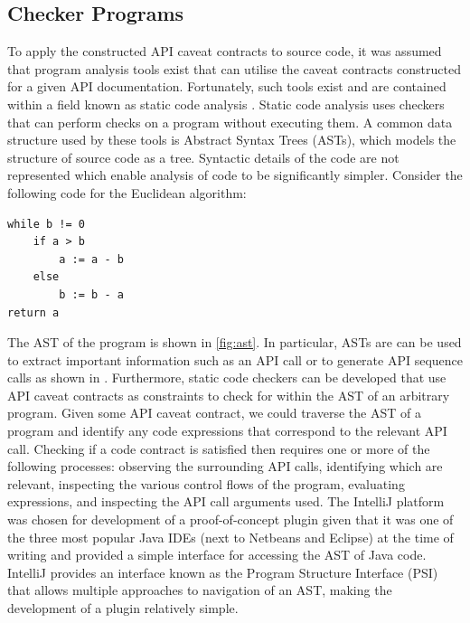 \subsection{Checker Programs}
To apply the constructed API caveat contracts to source code, it was assumed that program analysis tools exist that can utilise the caveat contracts constructed for a given API documentation. Fortunately, such tools exist and are contained within a field known as static code analysis \cite{1657940}. Static code analysis uses checkers that can perform checks on a program without executing them. A common data structure used by these tools is Abstract Syntax Trees (ASTs), which models the structure of source code as a tree. Syntactic details of the code are not represented which enable analysis of code to be significantly simpler. Consider the following code for the Euclidean algorithm:

\begin{verbatim}
while b != 0
    if a > b
        a := a - b
    else
        b := b - a
return a
\end{verbatim}

The AST of the program is shown in \ref{fig:ast}. In particular, ASTs are can be used to extract important information such as an API call or to generate API sequence calls as shown in \cite{code-examples}. Furthermore, static code checkers can be developed that use API caveat contracts as constraints to check for within the AST of an arbitrary program. Given some API caveat contract, we could traverse the AST of a program and identify any code expressions that correspond to the relevant API call. Checking if a code contract is satisfied then requires one or more of the following processes: observing the surrounding API calls, identifying which are relevant, inspecting the various control flows of the program, evaluating expressions, and inspecting the API call arguments used.
The IntelliJ platform was chosen for development of a proof-of-concept plugin given that it was one of the three most popular Java IDEs (next to Netbeans and Eclipse) at the time of writing and provided a simple interface for accessing the AST of Java code. IntelliJ provides an interface known as the Program Structure Interface (PSI) that allows multiple approaches to navigation of an AST, making the development of a plugin relatively simple.

